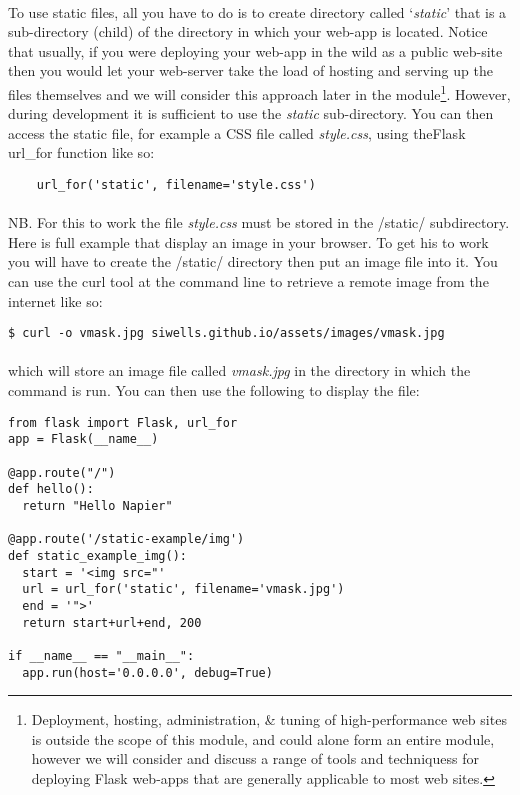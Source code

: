 \documentclass[12pt, a4paper, twoside]{book}
\begin{document}
\paragraph{} To use static files, all you have to do is to create directory called `\emph{static}' that is a sub-directory (child) of the directory in which your web-app is located. Notice that usually, if you were deploying your web-app in the wild as a public web-site then you would let your web-server take the load of hosting and serving up the files themselves and we will consider this approach later in the module\footnote{Deployment, hosting, administration, \& tuning of high-performance web sites is outside the scope of this module, and could alone form an entire module, however we will consider and discuss a range of tools and techniquess for deploying Flask web-apps that are generally applicable to most web sites.}. However, during development it is sufficient to use the \emph{static} sub-directory. You can then access the static file, for example a CSS file called \emph{style.css}, using theFlask url\_for function like so:

\begin{lstlisting}
    url_for('static', filename='style.css')
\end{lstlisting}

\paragraph{} NB. For this to work the file \emph{style.css} must be stored in the /static/ subdirectory. Here is full example that display an image in your browser. To get his to work you will have to create the /static/ directory then put an image file into it. You can use the curl tool at the command line to retrieve a remote image from the internet like so:

\begin{lstlisting}[style=DOS]
    $ curl -o vmask.jpg siwells.github.io/assets/images/vmask.jpg 
\end{lstlisting}

\paragraph{} which will store an image file called \emph{vmask.jpg} in the directory in which the command is run. You can then use the following to display the file:

\begin{lstlisting}
from flask import Flask, url_for
app = Flask(__name__)

@app.route("/")
def hello():
  return "Hello Napier"

@app.route('/static-example/img')
def static_example_img():
  start = '<img src="'
  url = url_for('static', filename='vmask.jpg')
  end = '">'
  return start+url+end, 200

if __name__ == "__main__":
  app.run(host='0.0.0.0', debug=True)
\end{lstlisting}
\end{document}
